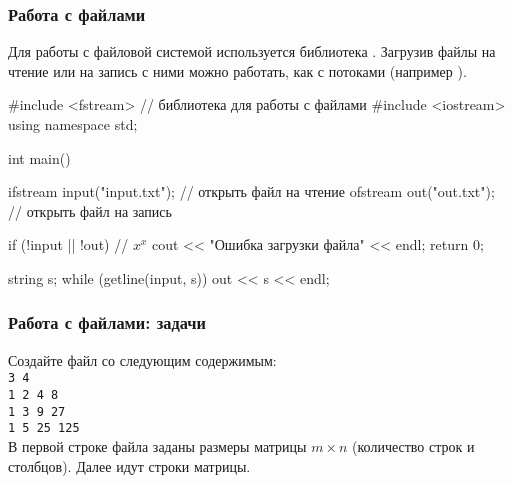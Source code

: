 \begin{frame}[fragile]
	\frametitle{Работа с файлами}
	Для работы с файловой системой используется библиотека . Загрузив
	файлы на чтение или на запись с ними можно работать, как с потоками
	(например ).
\begin{code}
#include <fstream> // библиотека для работы с файлами
#include <iostream>
using namespace std;

int main()
{
	ifstream input("input.txt"); // открыть файл на чтение
	ofstream out("out.txt"); // открыть файл на запись

	if (!input || !out) // $x^x$
	{
		cout << "Ошибка загрузки файла" << endl;
		return 0;
	}

	string s;
	while (getline(input, s))
		out << s << endl;
}
	\end{code}
\end{frame}

\begin{frame}
	\frametitle{Работа с файлами: задачи}
	Создайте файл  со следующим содержимым:
	{\\ \tt 3 4 \\ 1 2 4 8 \\ 1 3 9 27 \\ 1 5 25 125 \\}
	В первой строке файла заданы размеры матрицы $m \times n$ (количество строк и
	столбцов). Далее идут строки матрицы. \\

\end{frame}

